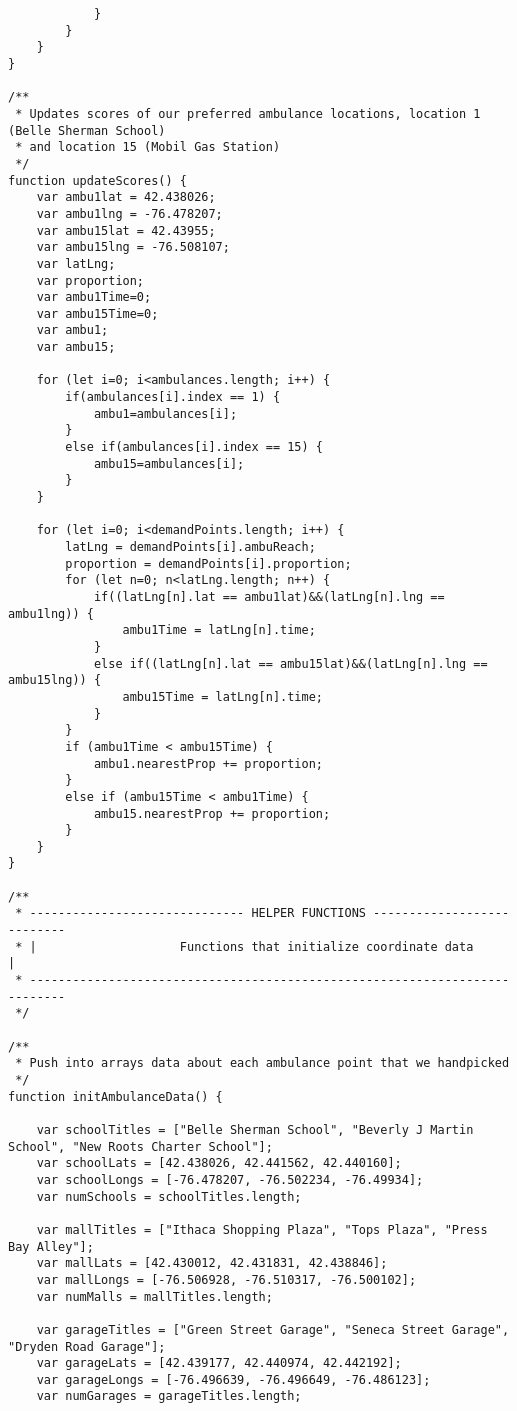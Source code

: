 \documentclass{article}
\newenvironment{code}{\captionsetup{type=listing}}{}
\begin{document}
\begin{code}
\begin{verbatim}
            }
        }
    }
}

/**
 * Updates scores of our preferred ambulance locations, location 1 (Belle Sherman School)
 * and location 15 (Mobil Gas Station)
 */
function updateScores() {
    var ambu1lat = 42.438026;
    var ambu1lng = -76.478207;
    var ambu15lat = 42.43955;
    var ambu15lng = -76.508107;
    var latLng;
    var proportion;
    var ambu1Time=0;
    var ambu15Time=0;
    var ambu1;
    var ambu15;

    for (let i=0; i<ambulances.length; i++) {
        if(ambulances[i].index == 1) {
            ambu1=ambulances[i];
        }
        else if(ambulances[i].index == 15) {
            ambu15=ambulances[i];
        }
    }

    for (let i=0; i<demandPoints.length; i++) {
        latLng = demandPoints[i].ambuReach;
        proportion = demandPoints[i].proportion;
        for (let n=0; n<latLng.length; n++) {
            if((latLng[n].lat == ambu1lat)&&(latLng[n].lng == ambu1lng)) {
                ambu1Time = latLng[n].time;
            }
            else if((latLng[n].lat == ambu15lat)&&(latLng[n].lng == ambu15lng)) {
                ambu15Time = latLng[n].time;
            }
        }
        if (ambu1Time < ambu15Time) {
            ambu1.nearestProp += proportion;
        }
        else if (ambu15Time < ambu1Time) {
            ambu15.nearestProp += proportion;
        }
    }
}

/**
 * ------------------------------ HELPER FUNCTIONS ---------------------------
 * |                    Functions that initialize coordinate data            |
 * ---------------------------------------------------------------------------
 */

/**
 * Push into arrays data about each ambulance point that we handpicked
 */
function initAmbulanceData() {

    var schoolTitles = ["Belle Sherman School", "Beverly J Martin School", "New Roots Charter School"];
    var schoolLats = [42.438026, 42.441562, 42.440160];
    var schoolLongs = [-76.478207, -76.502234, -76.49934];
    var numSchools = schoolTitles.length;

    var mallTitles = ["Ithaca Shopping Plaza", "Tops Plaza", "Press Bay Alley"];
    var mallLats = [42.430012, 42.431831, 42.438846];
    var mallLongs = [-76.506928, -76.510317, -76.500102];
    var numMalls = mallTitles.length;

    var garageTitles = ["Green Street Garage", "Seneca Street Garage", "Dryden Road Garage"];
    var garageLats = [42.439177, 42.440974, 42.442192];
    var garageLongs = [-76.496639, -76.496649, -76.486123];
    var numGarages = garageTitles.length;


\end{verbatim}
\end{code}
\end{document}
